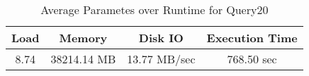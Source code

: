 \documentclass[../../main.tex]{subfiles}
\begin{document}
    \begin{table}
        \begin{center}
            \begin{tabular}{ |c|c|c|c| } 
            \hline
            Load & Memory & Disk IO & Execution Time\\
            \hline
            8.74 & 38214.14 MB & 13.77 MB/sec & 768.50 sec \\
            \hline
            \end{tabular}
            \\[1pt]
            \caption{Average Parametes over Runtime for Query20}
        \end{center}
    \end{table}
    \pagebreak
\end{document}
